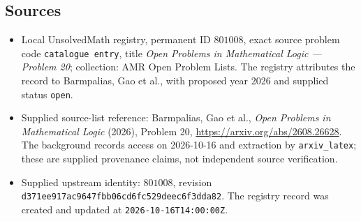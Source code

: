 \documentclass[11pt]{article}
\begin{document}
\subsection{Sources}
\begin{itemize}
\item Local UnsolvedMath registry, permanent ID \(801008\), exact source problem code \texttt{catalogue entry}, title \emph{Open Problems in Mathematical Logic --- Problem 20}; collection: AMR Open Problem Lists. The registry attributes the record to Barmpalias, Gao et al., with proposed year 2026 and supplied status \texttt{open}.
\item Supplied source-list reference: Barmpalias, Gao et al., \emph{Open Problems in Mathematical Logic} (2026), Problem 20, \url{https://arxiv.org/abs/2608.26628}. The background records access on 2026-10-16 and extraction by \texttt{arxiv\_latex}; these are supplied provenance claims, not independent source verification.
\item Supplied upstream identity: \(801008\), revision \texttt{d371ee917ac9647fbb06cd6fc529deec6f3dda82}. The registry record was created and updated at \texttt{2026-10-16T14:00:00Z}.
\end{itemize}
\end{document}
